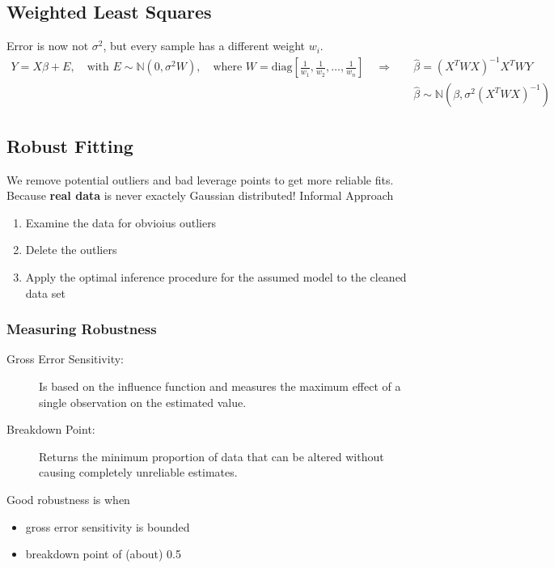\subsection{Weighted Least Squares}
Error is now not $\sigma^2$,
but every sample has a different weight $w_i$.
\begin{align*}
Y
=
X \beta + E
,\quad \text{with } E
\sim
\mathbb{N}(0, \sigma^2 W)
,\quad \text{where } W = \text{diag}\left[
\frac{1}{w_1}, \frac{1}{w_2}, \ldots, \frac{1}{w_n}
\right]
\quad \Rightarrow \quad
 &
\widehat{\beta}
=
(X^T W X)^{-1} X^T W Y \\
 &
\widehat{\beta}
\sim
\mathbb{N}\left(\beta, \sigma^2(X^T W X)^{-1}\right)
\end{align*}

\subsection{Robust Fitting}
We remove potential outliers and bad leverage points to get more reliable fits.
Because \textbf{real data} is never exactely Gaussian distributed!
Informal Approach
\begin{enumerate}
\item Examine the data for obvioius outliers
\item Delete the outliers
\item Apply the optimal inference procedure for the assumed model to the
cleaned data set
\end{enumerate}

\subsubsection{Measuring Robustness}
\begin{description}
\item[Gross Error Sensitivity:] Is based on the influence function and
measures the maximum effect of a single observation on the estimated value.
\item[Breakdown Point:] Returns the minimum proportion of data
that can be altered without causing completely unreliable estimates.
\end{description}
Good robustness is when
\begin{itemize}
\item gross error sensitivity is bounded
\item breakdown point of (about) 0.5
\end{itemize}

